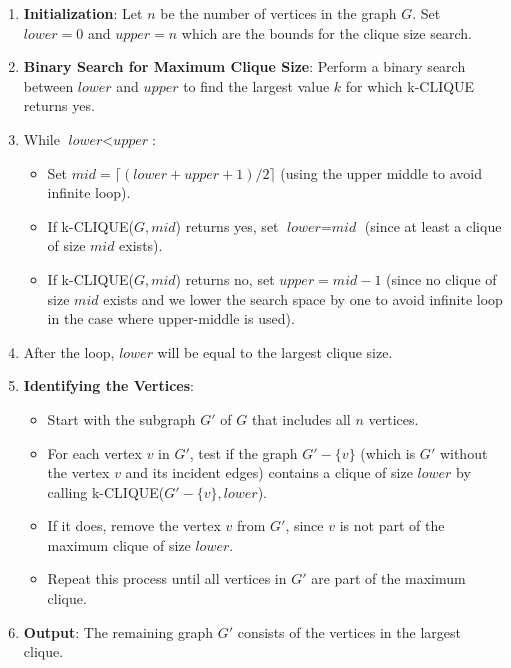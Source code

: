 \documentclass[letterpaper,12pt]{article}
\begin{document}
\begin{enumerate}
    \item \textbf{Initialization}: Let \( n \) be the number of vertices in the graph \( G \). Set \( \textit{lower} = 0 \) and \( \textit{upper} = n \) which are the bounds for the clique size search.
    \item \textbf{Binary Search for Maximum Clique Size}: Perform a binary search between \( \textit{lower} \) and \( \textit{upper} \) to find the largest value \( k \) for which k-CLIQUE returns yes.
    \item While \( \textit{lower} < \textit{upper} \):
    \begin{itemize}
        \item Set \( \textit{mid} = \lceil (\textit{lower} + \textit{upper} + 1) / 2 \rceil \) (using the upper middle to avoid infinite loop).
        \item If k-CLIQUE(\( G, \textit{mid} \)) returns yes, set \( \textit{lower} = \textit{mid} \) (since at least a clique of size \( \textit{mid} \) exists).
        \item If k-CLIQUE(\( G, \textit{mid} \)) returns no, set \( \textit{upper} = \textit{mid} - 1 \) (since no clique of size \( \textit{mid} \) exists and we lower the search space by one to avoid infinite loop in the case where upper-middle is used).
    \end{itemize}
    \item After the loop, \( \textit{lower} \) will be equal to the largest clique size.
    \item \textbf{Identifying the Vertices}:
    \begin{itemize}
        \item Start with the subgraph \( G' \) of \( G \) that includes all \( n \) vertices.
        \item For each vertex \( v \) in \( G' \), test if the graph \( G' - \{v\} \) (which is \( G' \) without the vertex \( v \) and its incident edges) contains a clique of size \( \textit{lower} \) by calling k-CLIQUE(\( G' - \{v\}, \textit{lower} \)).
        \item If it does, remove the vertex \( v \) from \( G' \), since \( v \) is not part of the maximum clique of size \( \textit{lower} \).
        \item Repeat this process until all vertices in \( G' \) are part of the maximum clique.
    \end{itemize}
    \item \textbf{Output}: The remaining graph \( G' \) consists of the vertices in the largest clique.
\end{enumerate}
\end{document}
